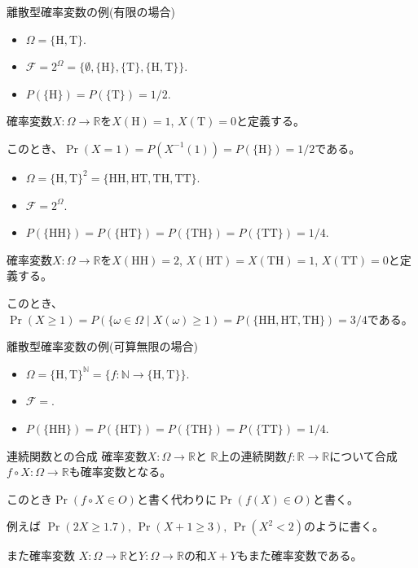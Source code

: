\documentclass[lualatex,handout]{beamer}
\theoremstyle{definition}
\begin{document}
\begin{frame}{離散型確率変数の例(有限の場合)}
\begin{itemize}
\item $\Omega = \{\mathrm{H},\mathrm{T}\}$.
\item $\mathcal{F} = 2^\Omega = \{\emptyset,\{\mathrm{H}\},\{\mathrm{T}\},\{\mathrm{H},\mathrm{T}\}\}$.
\item $P(\{\mathrm{H}\})=P(\{\mathrm{T}\})=1/2$.
\end{itemize}

\vspace{1em}
確率変数$X\colon\Omega\to\mathbb{R}$を$X(\mathrm{H})=1$, $X(\mathrm{T})=0$と定義する。

このとき、$\Pr(X = 1) = P(X^{-1}(1)) = P(\{\mathrm{H}\}) = 1/2$である。

\vspace{2em}
\begin{itemize}
\item $\Omega = \{\mathrm{H},\mathrm{T}\}^2 = \{\mathrm{HH},\mathrm{HT},\mathrm{TH},\mathrm{TT}\}$.
\item $\mathcal{F} = 2^\Omega$.
\item $P(\{\mathrm{HH}\})=P(\{\mathrm{HT}\})=P(\{\mathrm{TH}\})=P(\{\mathrm{TT}\})=1/4$.
\end{itemize}

\vspace{1em}
確率変数$X\colon\Omega\to\mathbb{R}$を$X(\mathrm{HH})=2$, $X(\mathrm{HT})=X(\mathrm{TH})=1$, $X(\mathrm{TT})=0$と定義する。

このとき、$\Pr(X \ge 1) = P(\{\omega\in\Omega\mid X(\omega)\ge 1) = P(\{\mathrm{HH},\mathrm{HT},\mathrm{TH}\}) = 3/4$である。
\end{frame}

\begin{frame}{離散型確率変数の例(可算無限の場合)}
\begin{itemize}
\item $\Omega = \{\mathrm{H},\mathrm{T}\}^{\mathbb{N}} = \{f\colon\mathbb{N}\to\{\mathrm{H},\mathrm{T}\}\}$.
\item $\mathcal{F} = $.
\item $P(\{\mathrm{HH}\})=P(\{\mathrm{HT}\})=P(\{\mathrm{TH}\})=P(\{\mathrm{TT}\})=1/4$.
\end{itemize}
\end{frame}

\begin{frame}{連続関数との合成}
確率変数$X\colon\Omega\to\mathbb{R}$と
$\mathbb{R}$上の連続関数$f\colon\mathbb{R}\to\mathbb{R}$について合成 $f\circ X\colon\Omega\to\mathbb{R}$も確率変数となる。

\vspace{1em}
このとき$\Pr(f\circ X \in O)$と書く代わりに$\Pr(f(X)\in O)$と書く。

\vspace{1em}
例えば $\Pr(2X \ge 1.7),\,\Pr(X+1\ge 3),\, \Pr(X^2 < 2)$のように書く。

\vspace{2em}
また確率変数 $X\colon \Omega\to \mathbb{R}$と$Y\colon \Omega\to \mathbb{R}$の和$X+Y$もまた確率変数である。

\end{frame}
\end{document}
